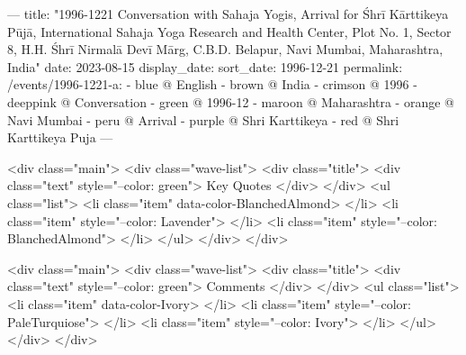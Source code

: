 ---
title: "1996-1221 Conversation with Sahaja Yogis, Arrival for Śhrī Kārttikeya Pūjā, International Sahaja Yoga Research and Health Center, Plot No. 1, Sector 8, H.H. Śhrī Nirmalā Devī Mārg, C.B.D. Belapur, Navi Mumbai, Maharashtra, India"
date: 2023-08-15
display_date: 
sort_date: 1996-12-21
permalink: /events/1996-1221-a:
  - blue @ English
  - brown @ India
  - crimson @ 1996
  - deeppink @ Conversation
  - green @ 1996-12
  - maroon @ Maharashtra
  - orange @ Navi Mumbai
  - peru @ Arrival
  - purple @ Shri Karttikeya
  - red @ Shri Karttikeya Puja
---

<div class="main">
  <div class="wave-list">
    <div class="title">
      <div class="text" style="--color: green">
        Key Quotes
      </div>
    </div>
    <ul class="list">
        <li class="item" data-color-BlanchedAlmond>
        </li>
        <li class="item" style="--color: Lavender">
        </li>
        <li class="item" style="--color: BlanchedAlmond">
        </li>
      </ul>
  </div>
</div>

<div class="main">
  <div class="wave-list">
    <div class="title">
      <div class="text" style="--color: green">
        Comments
      </div>
    </div>
    <ul class="list">
        <li class="item" data-color-Ivory>
        </li>
        <li class="item" style="--color: PaleTurquiose">
        </li>
        <li class="item" style="--color: Ivory">
        </li>
      </ul>
  </div>
</div>